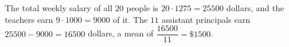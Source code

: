The total weekly salary of all $20$ people is $20\cdot1275=25500$ dollars, and the teachers earn $9\cdot1000=9000$ of it. The $11$ assistant principals earn $25500-9000=16500$ dollars, a mean of $\dfrac{16500}{11}=\boxed{\$1500}$.

